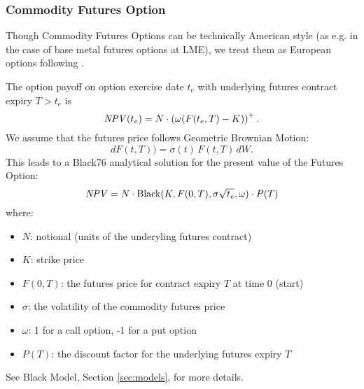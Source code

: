 \subsubsection{Commodity Futures Option}
\label{pricing:com_futuresoption}

Though Commodity Futures Options can be technically American style
 (as e.g. in the case of base metal futures options at LME),
we treat them as European options following \cite{Clark_2014}.

The option payoff on option exercise date $t_e$ with underlying futures
contract expiry $T>t_e$  is
$$
\mathit{NPV}(t_e) = N\cdot \left(\omega(F(t_e, T) - K)\right)^+.
$$
We assume that the futures price follows Geometric Brownian Motion:
$$
dF(t,T)) = \sigma(t)\,F(t,T)\,dW.
$$
This leads to a Black76 analytical solution for the present value of
the Futures Option:
$$
\mathit{NPV} = N\cdot \mbox{Black}(K, F(0,T), \sigma\sqrt{t_e},\omega)\cdot P(T)
$$
where:
\begin{itemize}
\item $N$: notional (units of the underyling futures contract)
\item $K$: strike price
\item $F(0,T)$: the futures price for contract expiry $T$ at time 0 (start)
\item $\sigma$: the volatility of the commodity futures price
\item $\omega$: 1 for a call option, -1 for a put option
\item $P(T)$: the discount factor for the underlying futures expiry $T$
\end{itemize}

See Black Model, Section \ref{sec:models}, for more details.

